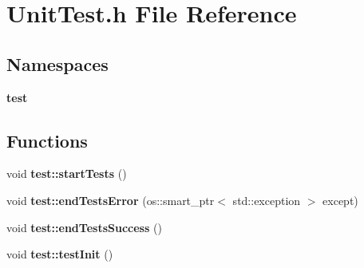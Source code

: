\section{Unit\+Test.\+h File Reference}
\label{UnitTest_8h}
\subsection*{Namespaces}
\begin{DoxyCompactItemize}
\item 
 {\bf test}
\end{DoxyCompactItemize}
\subsection*{Functions}
\begin{DoxyCompactItemize}
\item 
void {\bf test\+::start\+Tests} ()
\item 
void {\bf test\+::end\+Tests\+Error} (os\+::smart\+\_\+ptr$<$ std\+::exception $>$ except)
\item 
void {\bf test\+::end\+Tests\+Success} ()
\item 
void {\bf test\+::test\+Init} ()
\end{DoxyCompactItemize}
